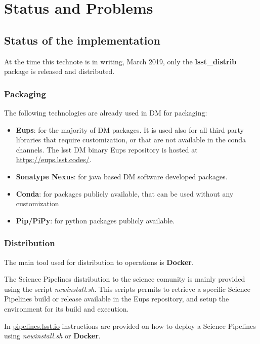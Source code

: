 \section{Status and Problems} \label{sec:statusAndProblems}

\subsection{Status of the implementation} \label{sec:status}

At the time this technote is in writing, March 2019, only the \textbf{lsst\_distrib} package is released and distributed.


\subsubsection{Packaging} \label{sec:statusPkgs}

The following technologies are already used in DM for packaging:

\begin{itemize}
\item {\bf Eups}: for the majority of DM packages. It is used also for all third party libraries that require customization, or that are not available in the conda channels. The lsst DM binary Eups repository is hosted at \url{https://eups.lsst.codes/}. 
\item {\bf Sonatype Nexus}: for java based DM software developed packages.
\item {\bf Conda}: for packages publicly available, that can be used without any customization
\item {\bf Pip/PiPy}: for python packages publicly available.
\end{itemize}


\subsubsection{Distribution} \label{sec:statusDistrib}

The main tool used for distribution to operations is \textbf{Docker}. 

The Science Pipelines distribution to the science comunity is mainly provided using the script \textit{newinstall.sh}. 
This scripts permits to retrieve a specific Science Pipelines build or release available in the Eups repository, and setup the environment for its build and execution.

In \url{pipelines.lsst.io} instructions are provided on how to deploy a Science Pipelines using \textit{newinstall.sh} or \textbf{Docker}.


